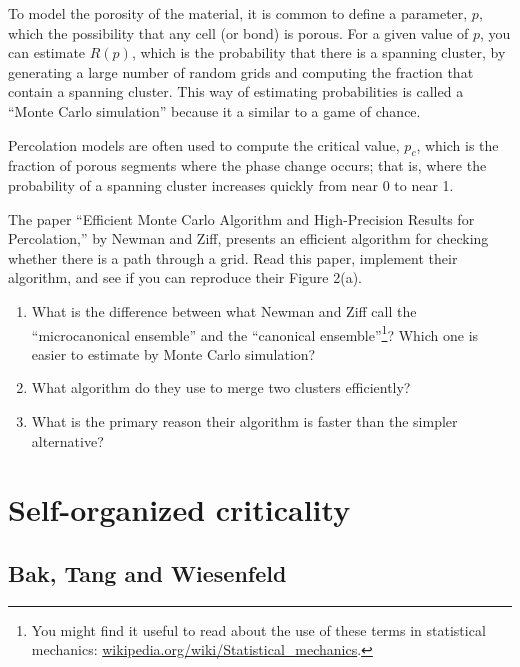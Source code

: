 \documentclass[10pt]{book}
\begin{document}
To model the porosity of the material, it is common to define
a parameter, $p$, which the possibility that any cell (or bond)
is porous.  For a given value of $p$, you can estimate 
$R(p)$, which is the probability that there is a spanning cluster,
by generating a large number of random grids and computing the
fraction that contain a spanning cluster.  This way of estimating
probabilities is called a ``Monte Carlo simulation'' because
it a similar to a game of chance.

Percolation models are often used to compute the critical value,
$p_c$, which is the fraction of porous segments where the phase
change occurs; that is, where the probability of a spanning cluster
increases quickly from near 0 to near 1.

\begin{ex}

The paper ``Efficient Monte Carlo Algorithm and High-Precision Results
for Percolation,'' by Newman and Ziff, presents an efficient algorithm
for checking whether there is a path through a grid.  Read this
paper, implement their algorithm, and see if you can reproduce their
Figure 2(a).

\begin{enumerate}

\item What is the difference between what Newman and Ziff call the
  ``microcanonical ensemble'' and the ``canonical
  ensemble''\footnote{You might find it useful to read about the use of
    these terms in statistical mechanics:
    \url{wikipedia.org/wiki/Statistical_mechanics}.}?  Which one is
  easier to estimate by Monte Carlo simulation?

\item What algorithm do they use to merge two clusters efficiently? 

\item What is the primary reason their algorithm is faster than the
  simpler alternative?

\end{enumerate}
 
\end{ex}



\chapter{Self-organized criticality}

\section{Bak, Tang and Wiesenfeld}
\end{document}
